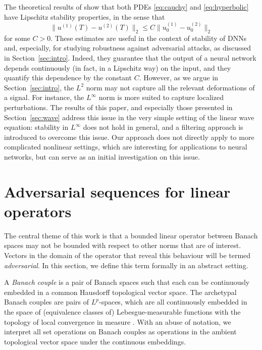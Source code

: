 \documentclass{article}
\theoremstyle{definition}
\begin{document}
The theoretical results of \cite{haber-ruthotto-2020} show that both PDEs \eqref{eq:cauchy} and \eqref{eq:hyperbolic} have Lipschitz stability properties, in the sense that
\begin{equation*}
    \|u^{(1)}(T)-u^{(2)}(T)\|_2\le C \|u^{(1)}_0-u^{(2)}_0\|_2
\end{equation*}
for some $C>0$.
These estimates are useful in the context of stability of DNNs and, especially, for studying robustness against adversarial attacks, as discussed in Section~\ref{sec:intro}. Indeed, they guarantee that the output of a neural network depends continuously (in fact, in a Lipschitz way) on the input, and they quantify this dependence by the constant $C$. However, as we argue in Section~\ref{sec:intro}, the $L^2$ norm may not capture all the relevant deformations of a signal. For instance, the $L^\infty$ norm is more suited to capture localized perturbations. The results of this paper, and especially those presented in Section~\ref{sec:wave} address this issue in the very simple setting of the linear wave equation: stability in $L^\infty$ does not hold in general, and a filtering approach is introduced to overcome this issue. Our approach does not directly apply to more complicated nonlinear settings, which are interesting for applications to neural networks, but can serve as an initial investigation on this issue. 


\section{Adversarial sequences for linear operators}\label{sec:adv}

The central theme of this work is that a bounded linear operator between Banach spaces may not be bounded with respect to other norms that are of interest.
Vectors in the domain of the operator that reveal this behaviour will be termed \emph{adversarial}.
In this section, we define this term formally in an abstract setting.

A \emph{Banach couple} is a pair of Banach spaces such that each can be continuously embedded in a common Hausdorff topological vector space.
The archetypal Banach couples are pairs of \(L^p\)-spaces, which are all continuously embedded in the space of (equivalence classes of) Lebesgue-measurable functions with the topology of local convergence in measure \cite{kalton2003interpolation}.
With an abuse of notation, we interpret all set operations on Banach couples as operations in the ambient topological vector space under the continuous embeddings.
\end{document}
